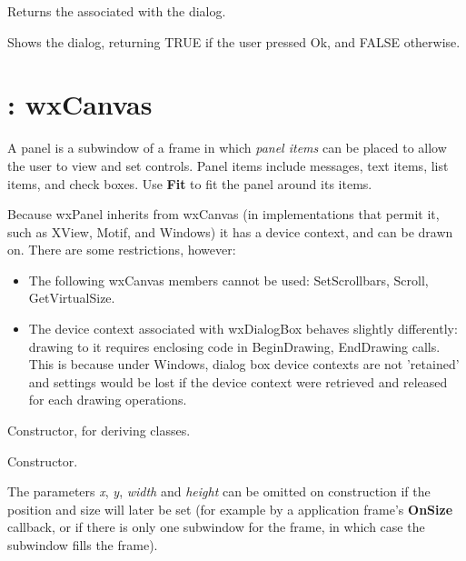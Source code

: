 Returns the  associated with the dialog.



Shows the dialog, returning TRUE if the user pressed Ok, and FALSE
otherwise.


\section{: wxCanvas}\label{wxpanel}

A panel is a subwindow of a frame in which {\it panel items} can be placed to allow
the user to view and set controls. Panel items include messages, text items, list items,
and check boxes. Use {\bf Fit} to fit the panel around its items.

Because wxPanel inherits from wxCanvas (in implementations that permit it,
such as XView, Motif, and Windows) it has a device context, and can be drawn
on. There are some restrictions, however:

\begin{itemize}\itemsep=0pt
\item The following wxCanvas members cannot be used: SetScrollbars, Scroll, GetVirtualSize.
\item The device context associated with wxDialogBox behaves slightly
differently: drawing to it requires enclosing code in BeginDrawing, EndDrawing
calls. This is because under Windows, dialog box device contexts are not 'retained'
and settings would be lost if the device context were retrieved and released
for each drawing operations.
\end{itemize}

\label{constrpanel}


Constructor, for deriving classes.


Constructor.

The parameters {\it x}, {\it y}, {\it width} and {\it height} can be
omitted on construction if the position and size will later be set (for
example by a application frame's {\bf OnSize} callback, or if there is
only one subwindow for the frame, in which case the subwindow fills the
frame).

